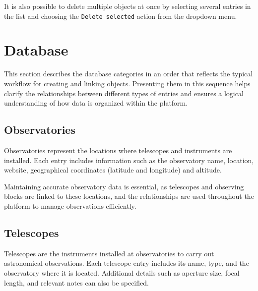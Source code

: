It is also possible to delete multiple objects at once by selecting several entries in the list and choosing the \texttt{Delete selected} action from the dropdown menu.



\section{Database}

This section describes the database categories in an order that reflects the typical workflow for creating and linking objects. Presenting them in this sequence helps clarify the relationships between different types of entries and ensures a logical understanding of how data is organized within the platform.

\subsection{Observatories}

Observatories represent the locations where telescopes and instruments are installed. Each entry includes information such as the observatory name, location, website, geographical coordinates (latitude and longitude) and altitude.


Maintaining accurate observatory data is essential, as telescopes and observing blocks are linked to these locations, and the relationships are used throughout the platform to manage observations efficiently.

\subsection{Telescopes}

Telescopes are the instruments installed at observatories to carry out astronomical observations. Each telescope entry includes its name, type, and the observatory where it is located. Additional details such as aperture size, focal length, and relevant notes can also be specified.



